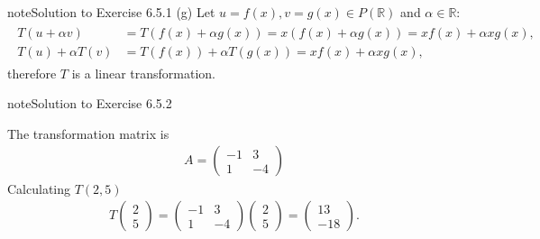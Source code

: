 \documentclass[letterpaper,10pt,english]{jupyterBook}
\begin{document}
\begin{sphinxadmonition}{note}{Solution to Exercise 6.5.1}
\sphinxAtStartPar
(g) Let \(u = f(x), v = g(x) \in P(\mathbb{R})\) and \(\alpha \in \mathbb{R}\):
\begin{equation*}
\begin{split} \begin{align*}
    T(u + \alpha v) &= T(f(x) + \alpha g(x)) = x(f(x) + \alpha g(x)) = xf(x) + \alpha x g(x), \\
    T(u) + \alpha T(v) &= T(f(x)) + \alpha T(g(x)) = xf(x) + \alpha x g(x),
\end{align*} \end{split}
\end{equation*}
\sphinxAtStartPar
therefore \(T\) is a linear transformation.
\end{sphinxadmonition}
 \label{_pages/A6_Linear_transformations_exercises_solutions:_pages/A6_Linear_transformations_exercises_solutions-solution-1}

\begin{sphinxadmonition}{note}{Solution to Exercise 6.5.2}



\sphinxAtStartPar
The transformation matrix is
\begin{equation*}
\begin{split} A = \begin{pmatrix} -1 & 3 \\ 1 & -4 \end{pmatrix} \end{split}
\end{equation*}
\sphinxAtStartPar
Calculating \(T (2, 5)\)
\begin{equation*}
\begin{split} T 
\begin{pmatrix} 2 \\ 5 \end{pmatrix} = 
\begin{pmatrix} -1 & 3 \\ 1 & -4 \end{pmatrix} 
\begin{pmatrix} 2 \\ 5 \end{pmatrix}
= \begin{pmatrix} 13 \\ -18 \end{pmatrix}. \end{split}
\end{equation*}\end{sphinxadmonition}
 \label{_pages/A6_Linear_transformations_exercises_solutions:_pages/A6_Linear_transformations_exercises_solutions-solution-2}
\end{document}
